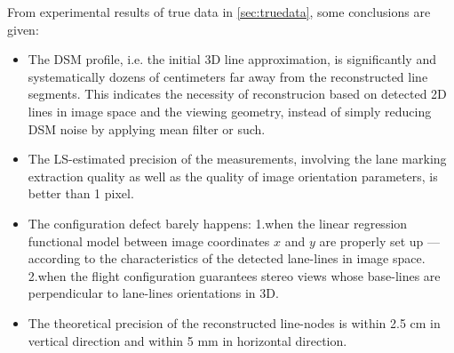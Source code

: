 From experimental results of true data in \cref{sec:truedata}, some conclusions are given:
\begin{itemize}
	\item The DSM profile, i.e. the initial 3D line approximation, is significantly and systematically dozens of centimeters far away from the reconstructed line segments. This indicates the necessity of reconstrucion based on detected 2D lines in image space and the viewing geometry, instead of simply reducing DSM noise by applying mean filter or such.
	
	\item The LS-estimated precision of the measurements, involving the lane marking extraction quality as well as the quality of image orientation parameters, is better than 1 pixel.

	\item The configuration defect %
	barely happens: 1.when the linear regression functional model between image coordinates $x$ and $y$ are properly set up ---according to the characteristics of the detected lane-lines in image space. 2.when the flight configuration guarantees stereo views whose base-lines are perpendicular to lane-lines orientations in 3D.
	
	\item The theoretical precision of the reconstructed line-nodes is within 2.5 cm in vertical direction and within 5 mm in horizontal direction.
	
\end{itemize}



